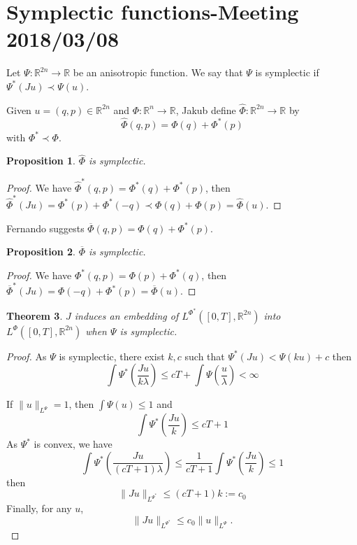 \documentclass[twoside]{article}
\newtheorem{thm}{Theorem}[section]
\newtheorem{prop}[thm]{Proposition}
\theoremstyle{remark}
\newcommand{\rr}{\mathbb{R}}
\renewcommand{\leq}{\leqslant}
\begin{document}
\section{Symplectic functions-Meeting 2018/03/08}


Let $\Psi:\rr^{2n}\to \rr$ be an anisotropic function.
We say that $\Psi$ is symplectic if $\Psi^*(Ju)\prec \Psi(u)$.

Given $u=(q,p)\in \rr^{2n}$ and $\Phi:\rr^n \to \rr$, 
Jakub define $\hat{\Phi}:\rr^{2n}\to \rr$ by
\[
\hat{\Phi}(q,p)=\Phi(q)+\Phi^*(p)
\]
with $\Phi^* \prec \Phi$.

\begin{prop}
$\hat{\Phi}$ is symplectic.
\end{prop}

\begin{proof}
We have ${\hat\Phi}^*(q,p)=\Phi^*(q)+\Phi^*(p)$, then 
${\hat \Phi}^*(Ju)=\Phi^*(p)+\Phi^*(-q)\prec \Phi(q)+\Phi(p)=\hat{\Phi}(u)$.
\end{proof}

Fernando suggests  $\overline{\Phi}(q,p)=\Phi(q)+\Phi^*(p)$.

\begin{prop}
$\overline \Phi$ is symplectic.
\end{prop}

\begin{proof}
We have $\Phi^*(q,p)=\Phi(p)+\Phi^*(q)$, then 
$\overline{\Phi}^*(Ju)=\Phi(-q)+\Phi^*(p)=\overline{\Phi}(u)$.
\end{proof}

\begin{thm}
$J$ induces an embedding of $L^{\Phi^*}([0,T],\rr^{2n})$
into $L^{\Phi}([0,T],\rr^{2n})$ when $\Psi$ is symplectic.
\end{thm}

\begin{proof}
As $\Psi$ is symplectic, there exist $k,c$ such that
$
\Psi^*(Ju)<\Psi(ku)+c
$
then 
\[
\int \Psi^*\left(\frac{Ju}{k \lambda}\right) \leq cT+\int \Psi\left(\frac{u}{\lambda}\right)<\infty
\]

If $\|u\|_{L^{\Psi}}=1$, then $\int \Psi(u)\leq 1$ and
\[
\int \Psi^*\left(\frac{Ju}{k}\right) \leq cT+1 
\]
As $\Psi^*$ is convex, we have 
\[
\int \Psi^*\left(\frac{Ju}{(cT+1) \lambda}\right) 
\leq \frac{1}{cT+1} \int \Psi^*\left(\frac{Ju}{k}\right)\leq 1
\]
then 
\[
\|Ju \|_{L^{\Psi^*}}\leq (cT+1)k:=c_0
\]
Finally, for any $u$, 
\[
\|Ju\|_{L^{\Psi^*}}\leq c_0\|u\|_{L^{\Psi}}.
\]
\end{proof}
\end{document}
